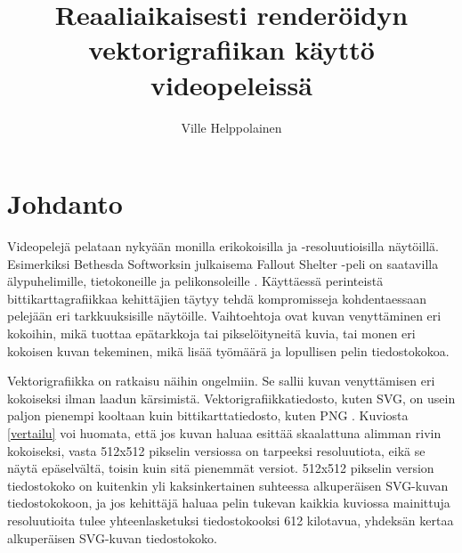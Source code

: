 \documentclass[utf8,bachelor]{gradu3}
\begin{document}
\title{Reaaliaikaisesti renderöidyn vektorigrafiikan käyttö videopeleissä}


\author{Ville Helppolainen}

\maketitle

\mainmatter


\chapter{Johdanto}

Videopelejä pelataan nykyään monilla erikokoisilla ja -resoluutioisilla näytöillä. Esimerkiksi Bethesda Softworksin julkaisema Fallout Shelter -peli on saatavilla älypuhelimille, tietokoneille ja pelikonsoleille \parencite{RefWorks:doc:5bd6d887e4b0a1f99c62e6de}. Käyttäessä perinteistä bittikarttagrafiikkaa kehittäjien täytyy tehdä kompromisseja kohdentaessaan pelejään eri tarkkuuksisille näytöille. Vaihtoehtoja ovat kuvan venyttäminen eri kokoihin, mikä tuottaa epätarkkoja tai pikselöityneitä kuvia, tai monen eri kokoisen kuvan tekeminen, mikä lisää työmäärä ja lopullisen pelin tiedostokokoa. \parencite{RefWorks:doc:5bd8319de4b03ae5c9b276b8}

Vektorigrafiikka on ratkaisu näihin ongelmiin. Se sallii kuvan venyttämisen eri kokoiseksi ilman laadun kärsimistä. Vektorigrafiikkatiedosto, kuten SVG, on usein paljon pienempi kooltaan kuin bittikarttatiedosto, kuten PNG \parencites{RefWorks:doc:5bdc5224e4b05afcfde5b159}{RefWorks:doc:5bdc5292e4b05afcfde5b171}. Kuviosta \ref{vertailu} voi huomata, että jos kuvan haluaa esittää skaalattuna alimman rivin kokoiseksi, vasta 512x512 pikselin versiossa on tarpeeksi resoluutiota, eikä se näytä epäselvältä, toisin kuin sitä pienemmät versiot. 512x512 pikselin version tiedostokoko on kuitenkin yli kaksinkertainen suhteessa alkuperäisen SVG-kuvan tiedostokokoon, ja jos kehittäjä haluaa pelin tukevan kaikkia kuviossa mainittuja resoluutioita tulee yhteenlasketuksi tiedostokooksi 612 kilotavua, yhdeksän kertaa alkuperäisen SVG-kuvan tiedostokoko. %
\end{document}
